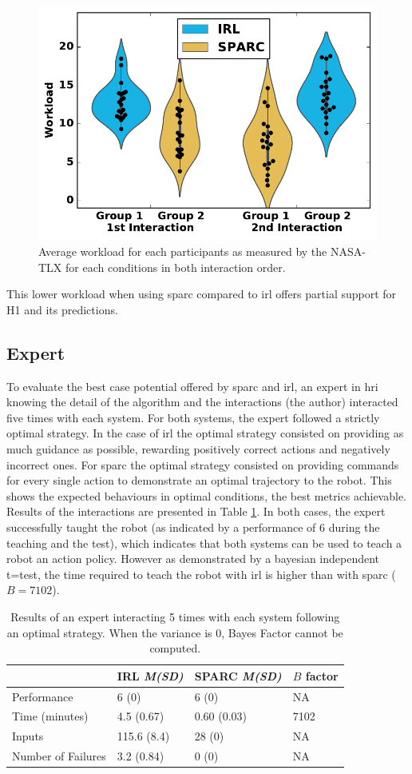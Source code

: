 \begin{figure}[ht]
	\includegraphics[width=.5\textwidth]{workload.pdf}
	\centering
	\caption{Average workload for each participants as measured by the NASA-TLX for each conditions in both interaction order.
	}
	\label{fig:control_workload}
\end{figure}

This lower workload when using \gls{sparc} compared to \gls{irl} offers partial support for H1 and its predictions.

\subsection{Expert} \label{ssec:control_expert}

To evaluate the best case potential offered by \gls{sparc} and \gls{irl}, an expert in \gls{hri} knowing the detail of the algorithm and the interactions (the author) interacted five times with each system. For both systems, the expert followed a strictly optimal strategy. In the case of \gls{irl} the optimal strategy consisted on providing as much guidance as possible, rewarding positively correct actions and negatively incorrect ones. For \gls{sparc} the optimal strategy consisted on providing commands for every single action to demonstrate an optimal trajectory to the robot. This shows the expected behaviours in optimal conditions, the best metrics achievable. Results of the interactions are presented in Table \ref{tab:control_expert}. In both cases, the expert successfully taught the robot (as indicated by a performance of 6 during the teaching and the test), which indicates that both systems can be used to teach a robot an action policy. However as demonstrated by a bayesian independent t=test, the time required to teach the robot with \gls{irl} is higher than with \gls{sparc} ($B=7102$). 

\begin{table}[ht]
	\centering
	\caption{Results of an expert interacting 5 times with each system following an optimal strategy. When the variance is 0, Bayes Factor cannot be computed.}
	\label{tab:control_expert}
	\begin{tabular}{@{}llll@{}}\toprule
		&IRL \textit{M(SD)} & SPARC \textit{M(SD)} & $B$ factor\\
		\midrule
		Performance & 6 (0) & 6 (0) & NA \\
		Time (minutes) & 4.5 (0.67) & 0.60 (0.03) & 7102 \\
		Inputs & 115.6 (8.4) & 28 (0) & NA \\
		Number of Failures & 3.2 (0.84) & 0 (0) & NA \\
		\bottomrule
	\end{tabular}
\end{table}

